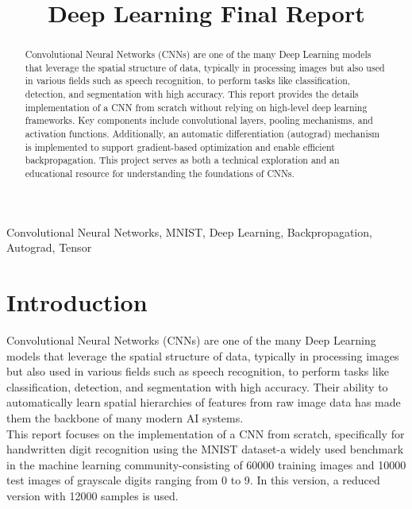 \documentclass[conference]{IEEEtran}
\begin{document}
\title{Deep Learning Final Report}

\author{
}

\maketitle

\begin{abstract}
Convolutional Neural Networks (CNNs) are one of the many Deep Learning models that leverage the spatial structure of data, typically in processing images but also used in various fields such as speech recognition, to perform tasks like classification, detection, and segmentation with high accuracy. This report provides the details implementation of a CNN from scratch without relying on high-level deep learning frameworks. Key components include convolutional layers, pooling mechanisms, and activation functions. Additionally, an automatic differentiation (autograd) mechanism is implemented to support gradient-based optimization and enable efficient backpropagation. This project serves as both a technical exploration and an educational resource for understanding the foundations of CNNs.
\end{abstract}

\begin{IEEEkeywords}
Convolutional Neural Networks, MNIST, Deep Learning, Backpropagation, Autograd, Tensor
\end{IEEEkeywords}

\section{Introduction}
Convolutional Neural Networks (CNNs) are one of the many Deep Learning models that leverage the spatial structure of data, typically in processing images but also used in various fields such as speech recognition, to perform tasks like classification, detection, and segmentation with high accuracy. Their ability to automatically learn spatial hierarchies of features from raw image data has made them the backbone of many modern AI systems.\\

\noindent This report focuses on the implementation of a CNN from scratch, specifically for handwritten digit recognition using the MNIST dataset-a widely used benchmark in the machine learning community-consisting of 60000 training images and 10000 test images of grayscale digits ranging from 0 to 9. In this version, a reduced version with 12000 samples is used.\\
\end{document}
